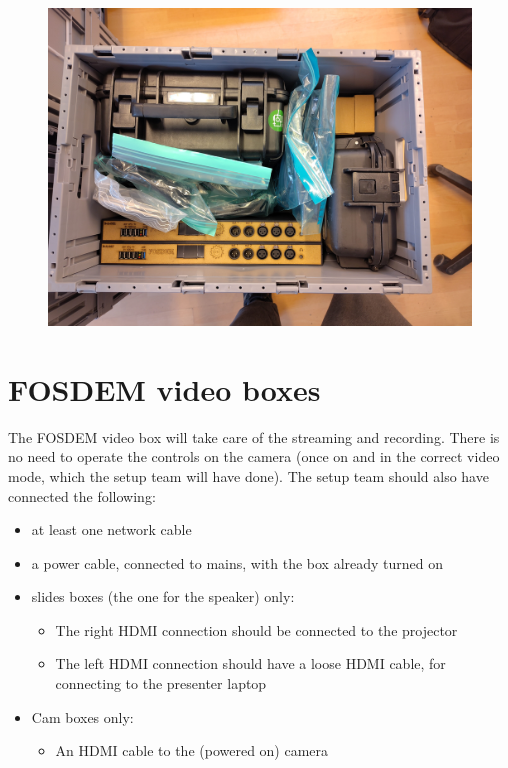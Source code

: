 \documentclass{article}
\begin{document}
\begin{figure}[H]
  \centering
  \includegraphics[width = 120mm]{per_room_video_box_filled.jpg}
\end{figure}

\section{FOSDEM video boxes}
The FOSDEM video box will take care of the streaming and recording.
There is no need to operate the controls on the camera (once on and in the correct video mode, which the setup team will have done). The setup team should also have connected the following:
\begin{itemize}
  \item at least one network cable
  \item a power cable, connected to mains, with the box already turned on
  \item slides boxes (the one for the speaker) only:
    \begin{itemize}
      \item The right HDMI connection should be connected to the projector
      \item The left HDMI connection should have a loose HDMI cable, for connecting to the presenter laptop
    \end{itemize}
  \item Cam boxes only:
    \begin{itemize}
      \item An HDMI cable to the (powered on) camera
    \end{itemize}
\end{itemize}
\end{document}
